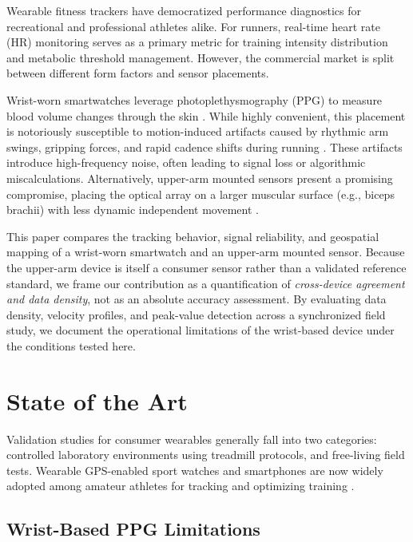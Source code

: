 \documentclass{acmsiggraph}
\begin{document}
	Wearable fitness trackers have democratized performance diagnostics for
	recreational and professional athletes alike. For runners, real-time
	heart rate (HR) monitoring serves as a primary metric for training
	intensity distribution and metabolic threshold management. However, the
	commercial market is split between different form factors and sensor
	placements.
	
	Wrist-worn smartwatches leverage photoplethysmography (PPG) to measure
	blood volume changes through the skin \cite{kim_photoplethysmography_2023}. While highly
	convenient, this placement is notoriously susceptible to motion-induced
	artifacts caused by rhythmic arm swings, gripping forces, and rapid
	cadence shifts during running \cite{kim_photoplethysmography_2023,schweizer2024heart}. These
	artifacts introduce high-frequency noise, often leading to signal loss
	or algorithmic miscalculations. Alternatively, upper-arm mounted sensors
	present a promising compromise, placing the optical array on a larger
	muscular surface (e.g., biceps brachii) with less dynamic independent
	movement \cite{schweizer2024heart}.
	
	This paper compares the tracking behavior, signal reliability, and
	geospatial mapping of a wrist-worn smartwatch and an upper-arm mounted
	sensor. Because the upper-arm device is itself a consumer sensor rather
	than a validated reference standard, we frame our contribution as a
	quantification of \emph{cross-device agreement and data density}, not as
	an absolute accuracy assessment. By evaluating data density, velocity
	profiles, and peak-value detection across a synchronized field study, we
	document the operational limitations of the wrist-based device under the
	conditions tested here.
	
	\section{State of the Art}
	
	Validation studies for consumer wearables generally fall into two
	categories: controlled laboratory environments using treadmill protocols,
	and free-living field tests. Wearable GPS-enabled sport watches and
	smartphones are now widely adopted among amateur athletes for tracking
	and optimizing training \cite{pobiruchin2017accuracy}.
	
	\subsection{Wrist-Based PPG Limitations}
	
\end{document}
